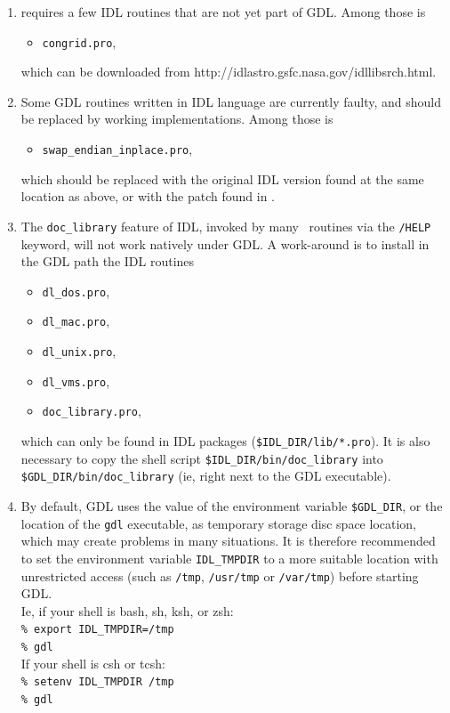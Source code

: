 \documentclass[12pt,twoside]{article}
\begin{document}
\begin{enumerate}
\item
\healpix requires a few IDL routines that are not yet part of GDL.
Among those is
\begin{itemize}
\item {\tt congrid.pro},
\end{itemize}
which can be downloaded from
{http://idlastro.gsfc.nasa.gov/idllibsrch.html}.

\item
Some GDL routines written in IDL language are currently faulty, and should be replaced by working implementations.
Among those is
\begin{itemize}
\item {\tt swap\_endian\_inplace.pro},
\end{itemize}
which should be replaced with the original IDL version found at the same location as above, or with the patch found in .

\item
The {\tt doc\_library} feature of IDL, invoked by many \healpix\ routines via the {\tt /HELP} keyword, will not work natively under GDL. A work-around is to install in the GDL path the IDL routines
\begin{itemize}
\item {\tt dl\_dos.pro},
\item {\tt dl\_mac.pro},
\item {\tt dl\_unix.pro},
\item {\tt dl\_vms.pro},
\item {\tt doc\_library.pro},
\end{itemize}
which can only be found in IDL packages
({\tt \$IDL\_DIR/lib/*.pro}). 
It is also necessary to copy the shell script {\tt \$IDL\_DIR/bin/doc\_library} into {\tt \$GDL\_DIR/bin/doc\_library} (ie, right next to the GDL executable).

\item 
By default, GDL uses the value of the environment variable {\tt \$GDL\_DIR}, or the location of the {\tt gdl} executable, 
as temporary storage disc space location, which may create problems in many situations.
It is therefore recommended to set the environment variable {\tt IDL\_TMPDIR} to a more suitable location
with unrestricted access
 (such as {\tt /tmp}, {\tt /usr/tmp} or {\tt /var/tmp}) before starting GDL.\\
Ie, if your shell is bash, sh, ksh, or zsh:\\
{\tt \% export IDL\_TMPDIR=/tmp}\hfill\\
{\tt \% gdl}\hfill\\
If your shell is csh or tcsh:\\
{\tt \% setenv IDL\_TMPDIR /tmp}\hfill\\
{\tt \% gdl}\hfill\\



\end{enumerate}
\end{document}
